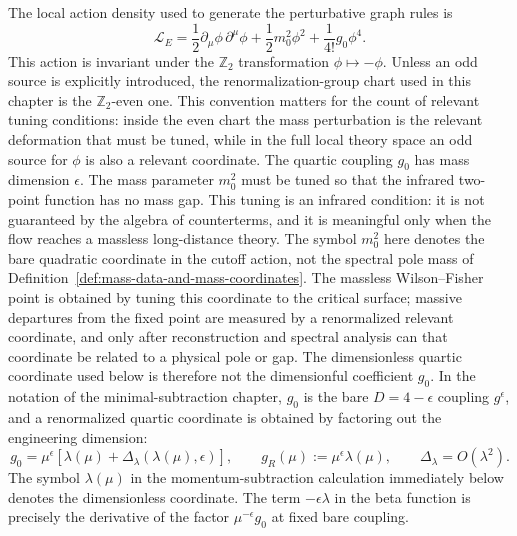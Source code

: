 The local action density used to generate the perturbative graph rules is
\[
  \mathcal L_E
  =
  \frac12\partial_\mu\phi\,\partial^\mu\phi
  +
  \frac12m_0^2\phi^2
  +
  \frac1{4!}g_0\phi^4 .
\]
This action is invariant under the \(\mathbb Z_2\) transformation
\(\phi\mapsto-\phi\).  Unless an odd source is explicitly introduced, the
renormalization-group chart used in this chapter is the \(\mathbb Z_2\)-even
one.  This convention matters for the count of relevant tuning conditions:
inside the even chart the mass perturbation is the relevant deformation that
must be tuned, while in the full local theory space an odd source for
\(\phi\) is also a relevant coordinate.
The quartic coupling \(g_0\) has mass dimension \(\epsilon\).  The mass
parameter \(m_0^2\) must be tuned so that the infrared two-point function has
no mass gap.  This tuning is an infrared condition: it is not guaranteed by
the algebra of counterterms, and it is meaningful only when the flow reaches a
massless long-distance theory.  The symbol \(m_0^2\) here denotes the bare
quadratic coordinate in the cutoff action, not the spectral pole mass of
Definition~\ref{def:mass-data-and-mass-coordinates}.  The massless
Wilson--Fisher point is obtained by tuning this coordinate to the critical
surface; massive departures from the fixed point are measured by a
renormalized relevant coordinate, and only after reconstruction and spectral
analysis can that coordinate be related to a physical pole or gap.
The dimensionless quartic coordinate used below is therefore not the
dimensionful coefficient \(g_0\).  In the notation of the minimal-subtraction
chapter, \(g_0\) is the bare \(D=4-\epsilon\) coupling \(g^\epsilon\), and a
renormalized quartic coordinate is obtained by factoring out the engineering
dimension:
\[
  g_0
  =
  \mu^\epsilon
  \left[
    \lambda(\mu)+\Delta_\lambda(\lambda(\mu),\epsilon)
  \right],
  \qquad
  g_R(\mu):=\mu^\epsilon\lambda(\mu),
  \qquad
  \Delta_\lambda=O(\lambda^2).
\]
The symbol \(\lambda(\mu)\) in the momentum-subtraction calculation immediately
below denotes the dimensionless coordinate.  The term \(-\epsilon\lambda\) in
the beta function is precisely the derivative of the factor
\(\mu^{-\epsilon}g_0\) at fixed bare coupling.

